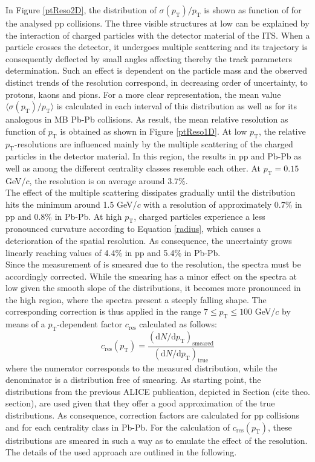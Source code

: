 \documentclass[12pt,a4paper]{report}
\begin{document}
\hspace{-0.3cm} In Figure \ref{ptReso2D}, the distribution of $\sigma(p_\text{T})/p_\text{T}$ is shown as function of \pt for the analysed pp collisions. The three visible structures at low \pt can be explained by the interaction of charged particles with the detector material of the ITS. When a particle crosses the detector, it undergoes multiple scattering and its trajectory is consequently deflected by small angles affecting thereby the track parameters determination. Such an effect is dependent on the particle mass and the observed distinct trends of the resolution correspond, in decreasing order of uncertainty, to protons, kaons and pions. For a more clear representation, the mean value $\langle\sigma(p_\text{T})/p_\text{T}\rangle$ is calculated in each \pt interval of this distribution as well as for its analogous in MB Pb-Pb collisions. As result, the mean relative \pt resolution as function of $p_\text{T}$ is obtained as shown in Figure \ref{ptReso1D}. At low $p_\text{T}$, the relative $p_\text{T}$-resolutions are influenced mainly by the multiple scattering of the charged particles in the detector material. In this region, the results in pp and Pb-Pb as well as among the different centrality classes resemble each other. At $p_\text{T} = 0.15$ GeV/$c$, the resolution is on average around 3.7\%.\\
The effect of the multiple scattering dissipates gradually until the distribution hits the minimum around 1.5 GeV/$c$ with a \pt resolution of approximately 0.7\% in pp and 0.8\% in Pb-Pb. At high $p_\text{T}$, charged particles experience a less pronounced curvature according to Equation \ref{radius}, which causes a deterioration of the spatial resolution. As consequence, the uncertainty grows linearly reaching values of 4.4\% in pp and 5.4\% in Pb-Pb.\\
Since the measurement of \pt is smeared due to the resolution, the \pt spectra must be accordingly corrected. While the smearing has a minor effect on the \pt spectra at low \pt given the smooth slope of the distributions, it becomes more pronounced in the high \pt region, where the \pt spectra present a steeply falling shape. The corresponding correction is thus applied in the range $7 \leq p_\text{T} \leq 100$ GeV/$c$ by means of a $p_\text{T}$-dependent factor $c_\text{res}$ calculated as follows: 
\begin{equation}
c_\text{res}(p_\text{T}) = \dfrac{(\text{d}N/\text{d}p_\text{T})_\text{smeared}}{(\text{d}N/\text{d}p_\text{T})_\text{true}}
\end{equation}
where the numerator corresponds to the measured \pt distribution, while the denominator is a \pt distribution free of smearing. As starting point, the \pt distributions from the previous ALICE publication, depicted in Section (cite theo. section), are used  given that they offer a good approximation of the true \pt distributions. As consequence, correction factors are calculated for pp collisions and for each centrality class in Pb-Pb. For the calculation of $c_\text{res}(p_\text{T})$, these \pt distributions are smeared in such a way as to emulate the effect of the \pt resolution. The details of the used approach are outlined in the following.
\end{document}
